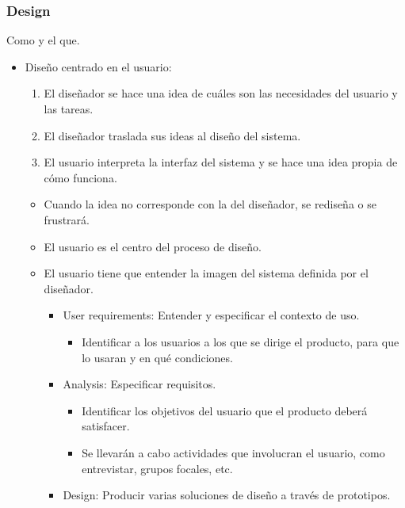 \documentclass[12pt, twoside, openright]{report} %
\begin{document}
\subsubsection{Design}
	Como y el que.

    \begin{itemize}
    
    \item
      Diseño centrado en el usuario:

      \begin{enumerate}
      \def\labelenumi{\arabic{enumi}.}
      
      \item
        El diseñador se hace una idea de cuáles son las necesidades del
        usuario y las tareas.
      \item
        El diseñador traslada sus ideas al diseño del sistema.
      \item
        El usuario interpreta la interfaz del sistema y se hace una idea
        propia de cómo funciona.
      \end{enumerate}

      \begin{itemize}
      
      \item
        Cuando la idea no corresponde con la del diseñador, se rediseña
        o se frustrará.
      \item
        El usuario es el centro del proceso de diseño.
      \item
        El usuario tiene que entender la imagen del sistema definida por
        el diseñador.

        \begin{itemize}
        \item
          User requirements: Entender y especificar el contexto de uso.

          \begin{itemize}
          
          \item
            Identificar a los usuarios a los que se dirige el producto,
            para que lo usaran y en qué condiciones.
          \end{itemize}
        \item
          Analysis: Especificar requisitos.

          \begin{itemize}
          
          \item
            Identificar los objetivos del usuario que el producto deberá
            satisfacer.
          \item
            Se llevarán a cabo actividades que involucran el usuario,
            como entrevistar, grupos focales, etc.
          \end{itemize}
        \item
          Design: Producir varias soluciones de diseño a través de
          prototipos.


\end{itemize}
\end{itemize}
\end{itemize}
\end{document}
